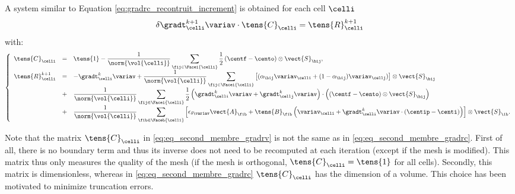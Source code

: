 A system similar to Equation \eqref{eq:gradrc_recontruit_increment} is obtained
for each cell $\celli$
%
\begin{equation}\label{eq:eq_systeme_matriciel_gradrv}
\delta \gradt_{\celli}^{k+1} \variav
\cdot
\tens{C}_{\celli}
=
\tens{R}^{k+1}_{\celli}
\end{equation}
%
with:
%
\begin{equation}\label{eq:eq_second_membre_gradrv}
\left\{\begin{array}{rcl}
\tens{C}_{\celli}  &=&
\displaystyle
 \tens{1} -
\dfrac{1}{\norm{\vol{\celli}}}\sum\limits_{ \fij \in \Facei{\celli}} \frac{1}{2}  \left(\centf - \cento\right) \otimes \vect{S}_{\bij}
,\\
\tens{R}^{k+1}_{\celli} &=&
\displaystyle
 -  \gradt_{\celli}^{k} \variav
 + \dfrac{1}{\norm{\vol{\celli}}}
\sum\limits_{\fij \in \Facei{\celli}}\left[
(\alpha_{\bij} \variav_{\celli} + (1 - \alpha_{\bij}) \variav_{\cellj})\right] \otimes \vect{S}_{\bij} \\
&+& \displaystyle
 \dfrac{1}{\norm{\vol{\celli}}}
\sum\limits_{\fij \in \Facei{\celli}} \frac{1}{2}
\left(\gradt_{\celli}^k \variav + \gradt_{\cellj}^k \variav \right) \cdot \left( \left(\centf - \cento\right) \otimes \vect{S}_{\bij} \right) \\
&+& \displaystyle
 \dfrac{1}{\norm{\vol{\celli}}}
\sum\limits_{\fib \in \Faceb{\celli}}\left[ \epsilon_{\delta \variav} \vect{A}_{\fib}
+ \tens{B}_{\fib} \left( \variav_{\celli} + \gradt_{\celli}^k \variav \cdot \left(\centip - \centi\right) \right)  \right] \otimes \vect{S}_{\ib} .
\end{array}\right.
\end{equation}

\begin{remark}
Note that the matrix $\tens{C}_{\celli}$ in \eqref{eq:eq_second_membre_gradrv} is not the same as in \eqref{eq:eq_second_membre_gradrc}. First of all,
there is no boundary term and thus its inverse does not need  to be recomputed at each iteration (except if the mesh is modified). This matrix thus  only
measures the quality of the mesh (if the mesh is orthogonal, $\tens{C}_{\celli} = \tens{1}$ for all cells).
Secondly, this matrix is dimensionless, whereas in \eqref{eq:eq_second_membre_gradrc} $\tens{C}_{\celli}$ has the dimension of a volume. This choice has
been motivated to minimize truncation errors.
\end{remark}

